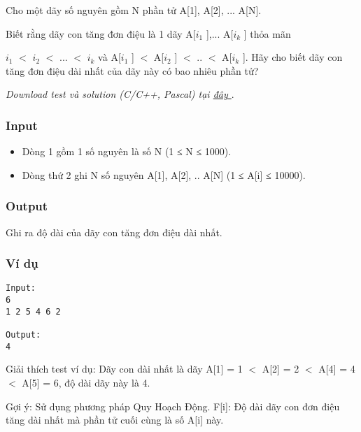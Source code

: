



   Cho một dãy số nguyên gồm N phần tử A[1], A[2], ... A[N].   


   Biết rằng dãy con tăng đơn điệu là 1 dãy A[$i_{1}$   ],... A[$i_{k}$   ] thỏa mãn   


   $i_{1}$   $<$ $i_{2}$   $<$ ... $<$ $i_{k}$   và A[$i_{1}$   ] $<$ A[$i_{2}$   ] $<$ .. $<$ A[$i_{k}$   ]. Hãy cho biết dãy con tăng đơn điệu dài nhất của dãy này có bao nhiêu phần tử?   





\textit{    Download test và solution (C/C++, Pascal) tại    \href{https://vn.spoj.pl/content/liq.zip}{     đây    }}   .  

\subsubsection{   Input  }
\begin{itemize}
	\item     Dòng 1 gồm 1 số nguyên là số N (1 ≤ N ≤ 1000).   
	\item     Dòng thứ 2 ghi N số nguyên A[1], A[2], .. A[N] (1 ≤ A[i] ≤ 10000).   
\end{itemize}

\subsubsection{   Output  }

   Ghi ra độ dài của dãy con tăng đơn điệu dài nhất.  

\subsubsection{   Ví dụ  }
\begin{verbatim}
Input:
6
1 2 5 4 6 2 

Output:
4
\end{verbatim}

       Giải thích test ví dụ:      Dãy con dài nhất là dãy A[1] = 1 $<$ A[2] = 2 $<$ A[4] = 4 $<$ A[5] = 6, độ dài dãy này là 4.  

       Gợi ý:      Sử dụng phương pháp Quy Hoạch Động. F[i]: Độ dài dãy con đơn điệu tăng dài nhất mà phần tử cuối cùng là số A[i] này.  
